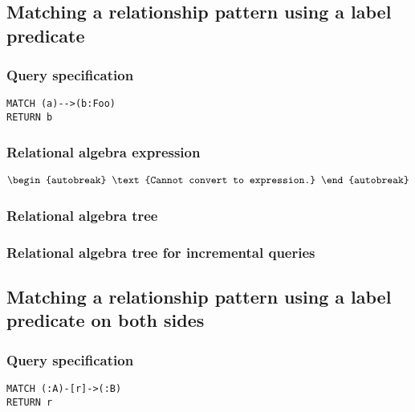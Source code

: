 \subsection{Matching a relationship pattern using a label predicate}

\subsubsection*{Query specification}

\begin{lstlisting}
MATCH (a)-->(b:Foo)
RETURN b
\end{lstlisting}

\subsubsection*{Relational algebra expression}

\begin{align*}
\begin{autobreak}
\text{Cannot convert to expression.}
\end{autobreak}
\end{align*}

\subsubsection*{Relational algebra tree}


\subsubsection*{Relational algebra tree for incremental queries}


\subsection{Matching a relationship pattern using a label predicate on both sides}

\subsubsection*{Query specification}

\begin{lstlisting}
MATCH (:A)-[r]->(:B)
RETURN r
\end{lstlisting}

